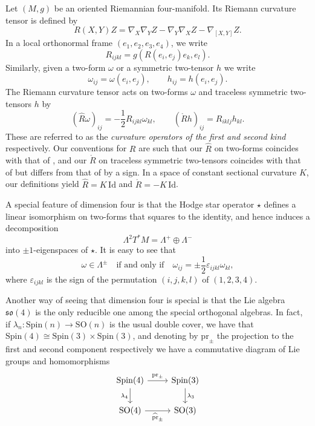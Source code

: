 \documentclass[oneside,12pt]{amsart}
\theoremstyle{definition}
\numberwithin{equation}{section}
\begin{document}
Let $(M,g)$ be an oriented Riemannian four-manifold. Its Riemann curvature tensor is defined by 
\[
R(X,Y)Z = \nabla_X \nabla_Y Z - \nabla_Y \nabla_X Z - \nabla_{[X,Y]} Z . 
\]
In a local orthonormal frame $(e_1 , e_2 , e_3 , e_4)$, we write 
\[
R_{ijkl} = g(R(e_i , e_j) e_k , e_l) .  
\]
Similarly, given a two-form $\omega$ or a symmetric two-tensor $h$ we write 
\[
\omega_{ij} = \omega(e_i , e_j) , \qquad h_{ij} = h(e_i , e_j) . 
\]
The Riemann curvature tensor acts on two-forms $\omega$ and traceless symmetric two-tensors $h$ by 
\[ 
(\widehat{R} \omega)_{ij} = -\frac{1}{2} R_{ijkl} \omega_{kl} , \qquad (\mathring{R}h)_{ij} = R_{iklj}h_{kl} .  
\]
These are referred to as the \emph{curvature operators of the first and second kind} respectively. Our conventions for $R$ are such that our $\widehat{R}$ on two-forms coincides with that of \cite{FKS, CGT, SS}, and our $\mathring{R}$ on traceless symmetric two-tensors coincides with that of \cite{SS} but differs from that of \cite{CGT} by a sign. In a space of constant sectional curvature $K$, our definitions yield $\widehat{R} = K \, \mathrm{Id}$ and $\mathring{R} = -K \, \mathrm{Id}$. 

A special feature of dimension four is that the Hodge star operator $\star$ defines a linear isomorphism on two-forms that squares to the identity, and hence induces a decomposition 
\[
\Lambda^2 T^*M = \Lambda^+ \oplus \Lambda^- 
\]
into $\pm 1$-eigenspaces of $\star$. It is easy to see that 
\[
\omega \in \Lambda^{\pm} \quad \text{if and only if} \quad \omega_{ij} = \pm \frac{1}{2} \varepsilon_{ijkl} \omega_{kl} ,
\] 
where $\varepsilon_{ijkl}$ is the sign of the permutation $(i,j,k,l)$ of $(1,2,3,4)$. 

Another way of seeing that dimension four is special is that the Lie algebra $\mathfrak{so}(4)$ is the only reducible one among the special orthogonal algebras. In fact, if $\lambda_n \colon \mathrm{Spin}(n) \to \mathrm{SO}(n)$ is the usual double cover, we have that $\mathrm{Spin}(4) \cong \mathrm{Spin}(3) \times \mathrm{Spin}(3)$, and denoting by $\mathrm{pr}_{\pm}$ the projection to the first and second component respectively we have a commutative diagram of Lie groups and homomorphisms 
\[
\begin{tikzcd}
\mathrm{Spin}(4) \arrow[r, "\mathrm{pr}_{\pm}"] \arrow[d, "\lambda_4"'] & \mathrm{Spin}(3) \arrow[d, "\lambda_3"] \\
\mathrm{SO}(4) \arrow[r, "\widehat{\mathrm{pr}}_{\pm}"']                 & \mathrm{SO}(3)
\end{tikzcd}
\]
\end{document}
